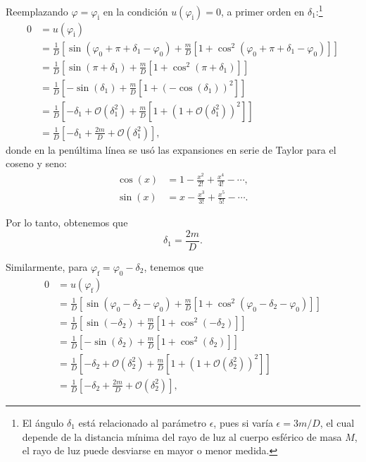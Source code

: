\documentclass[letterpaper,11pt]{article}
\begin{document}
Reemplazando $\varphi = \varphi_{\text{i}}$ en la condición $u(\varphi_{\text{i}}) = 0$, a primer orden en $\delta_1$:\footnote{El ángulo $\delta_1$ está relacionado al parámetro $\epsilon$, pues si varía $\epsilon = 3m/D$, el cual depende de la distancia mínima del rayo de luz al cuerpo esférico de masa $M$, el rayo de luz puede desviarse en mayor o menor medida.}
\begin{align}
0 &= u(\varphi_{\text{i}}) \nonumber \\
&= \frac{1}{D} \left[ \sin(\varphi_0 + \pi + \delta_1 - \varphi_0) + \frac{m}{D} \left[ 1 + \cos^2(\varphi_0 + \pi + \delta_1-\varphi_0)\right] \right] \nonumber \\
&= \frac{1}{D} \left[ \sin(\pi + \delta_1) + \frac{m}{D} \left[ 1 + \cos^2(\pi + \delta_1)\right] \right] \nonumber\\
&= \frac{1}{D} \left[ - \sin(\delta_1) + \frac{m}{D} \left[ 1 + (-\cos(\delta_1))^2\right] \right] \nonumber\\
&= \frac{1}{D} \left[ - \delta_1 + \mathcal{O}(\delta_1^2) + \frac{m}{D} \left[ 1 + (1 + \mathcal{O}(\delta_1^2))^2 \right] \right]\nonumber \\
&= \frac{1}{D} \left[ - \delta_1  + \frac{2m}{D} + \mathcal{O}(\delta_1^2) \right],
\end{align}
donde en la penúltima línea se usó las expansiones en serie de Taylor para el coseno y seno:
\begin{align}
\cos(x) &= 1 - \frac{x^2}{2!} + \frac{x^4}{4!} - \cdots, \\
\sin(x) &= x - \frac{x^3}{3!} + \frac{x^5}{5!} - \cdots . 
\end{align}

Por lo tanto, obtenemos que
\begin{equation}
\delta_1 = \frac{2m}{D}.
\end{equation}

Similarmente, para $\varphi_{\text{f}} = \varphi_0 - \delta_2$, tenemos que
\begin{align}
0 &= u(\varphi_{\text{f}}) \nonumber \\
&= \frac{1}{D} \left[ \sin(\varphi_0 - \delta_2 - \varphi_0) + \frac{m}{D} \left[ 1 + \cos^2(\varphi_0 - \delta_2-\varphi_0)\right] \right] \nonumber \\
&= \frac{1}{D} \left[ \sin( - \delta_2) + \frac{m}{D} \left[ 1 + \cos^2( - \delta_2)\right] \right] \nonumber\\
&= \frac{1}{D} \left[ - \sin(\delta_2) + \frac{m}{D} \left[ 1 + \cos^2(\delta_2)\right] \right] \nonumber\\
&= \frac{1}{D} \left[ - \delta_2 + \mathcal{O}(\delta_2^2) + \frac{m}{D} \left[ 1 + (1 + \mathcal{O}(\delta_2^2))^2 \right] \right]\nonumber \\
&= \frac{1}{D} \left[ - \delta_2  + \frac{2m}{D} + \mathcal{O}(\delta_2^2) \right],
\end{align}
\end{document}
